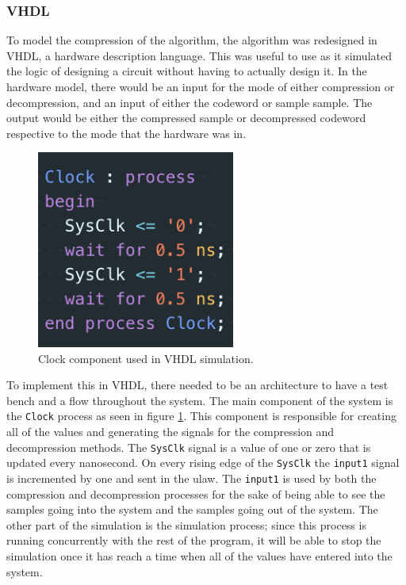\documentclass[12pt]{article}
\begin{document}
\subsubsection*{VHDL}

To model the compression of the algorithm, the algorithm was redesigned in VHDL, a hardware description language. This was useful to use as it simulated the logic of designing a circuit without having to actually design it. In the hardware model, there would be an input for the mode of either compression or decompression, and an input of either the codeword or sample sample. The output would be either the compressed sample or decompressed codeword respective to the mode that the hardware was in. \\

\begin{figure}[!h]
		\centering
        \includegraphics[width=6.5cm ]
        {clock_comp.png}
        \caption{\label{fig:clock_comp} Clock component used in VHDL simulation.}
\end{figure}


To implement this in VHDL, there needed to be an architecture to have a test bench and a flow throughout the system. The main component of the system is the \texttt{Clock} process as seen in figure \ref{fig:clock_comp}. This component is responsible for creating all of the values and generating the signals for the compression and decompression methods. The \texttt{SysClk} signal is a value of one or zero that is updated every nanosecond. On every rising edge of the \texttt{SysClk} the \texttt{input1} signal is incremented by one and sent in the ulaw. The \texttt{input1} is used by both the compression and decompression processes for the sake of being able to see the samples going into the system and the samples going out of the system. The other part of the simulation is the simulation process; since this process is running concurrently with the rest of the program, it will be able to stop the simulation once it has reach a time when all of the values have entered into the system.\\
\end{document}
